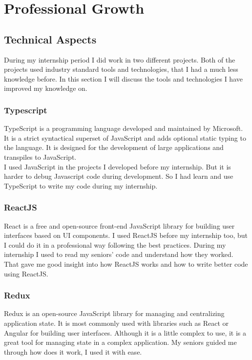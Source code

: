 \chapter{Professional Growth}

\section{Technical Aspects}

During my internship period I did work in two different projects.
Both of the projects used industry standard tools and technologies, that I had a much less knowledge before.
In this section I will discuss the tools and technologies I have improved my knowledge on.

\subsection{Typescript}

TypeScript is a programming language developed and maintained by Microsoft.
It is a strict syntactical superset of JavaScript and adds optional static typing to the language.
It is designed for the development of large applications and transpiles to JavaScript.\\

I used JavaScript in the projects I developed before my internship.
But it is harder to debug Javascript code during development.
So I had learn and use TypeScript to write my code during my internship.

\subsection{ReactJS}

React is a free and open-source front-end JavaScript library for building user interfaces based on UI components.
I used ReactJS before my internship too, but I could do it in a professional way following the best practices.
During my internship I used to read my seniors' code and understand how they worked.
That gave me good insight into how ReactJS works and how to write better code using ReactJS.

\subsection{Redux}

Redux is an open-source JavaScript library for managing and centralizing application state.
It is most commonly used with libraries such as React or Angular for building user interfaces.
Although it is a little complex to use, it is a great tool for managing state in a complex application.
My seniors guided me through how does it work, I used it with ease.

